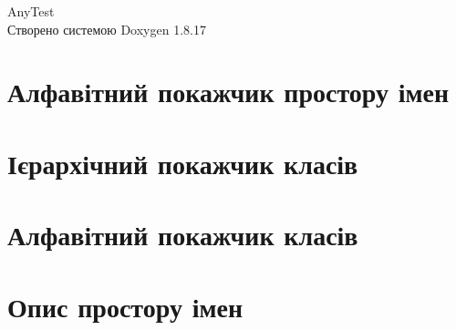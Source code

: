 \let\mypdfximage\pdfximage\def\pdfximage{\immediate\mypdfximage}\documentclass[twoside]{book}
\newcommand{\+}{\discretionary{\mbox{\scriptsize$\hookleftarrow$}}{}{}}
\newcommand{\clearemptydoublepage}{%
  \newpage{\pagestyle{empty}\cleardoublepage}%
}
\begin{document}
\hypersetup{pageanchor=false,
             bookmarksnumbered=true,
             pdfencoding=unicode
            }
\begin{titlepage}
\vspace*{7cm}
\begin{center}%
{\Large Any\+Test }\\
\vspace*{1cm}
{\large Створено системою Doxygen 1.8.17}\\
\end{center}
\end{titlepage}
\clearemptydoublepage
{}
\tableofcontents
\clearemptydoublepage
{}
\hypersetup{pageanchor=true}

\chapter{Алфавітний покажчик простору імен}

\chapter{Ієрархічний покажчик класів}

\chapter{Алфавітний покажчик класів}

\chapter{Опис простору імен}













\end{document}
